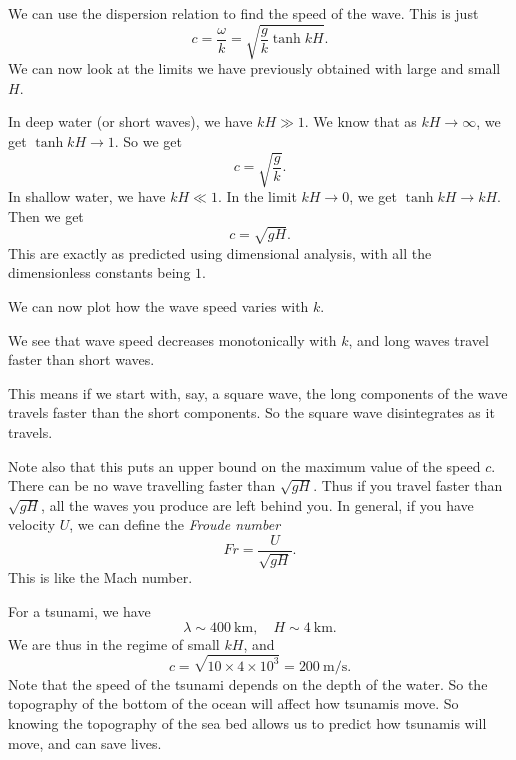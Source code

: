 \documentclass[a4paper]{article}
\begin{document}
We can use the dispersion relation to find the speed of the wave. This is just
\[
  c = \frac{\omega}{k} = \sqrt{\frac{g}{k}\tanh kH}.
\]
We can now look at the limits we have previously obtained with large and small $H$.

In deep water (or short waves), we have $kH \gg 1$. We know that as $kH \to \infty$, we get $\tanh kH \to 1$. So we get
\[
  c = \sqrt{\frac{g}{k}}.
\]
In shallow water, we have $kH \ll 1$. In the limit $kH \to 0$, we get $\tanh kH \to kH$. Then we get
\[
  c = \sqrt{gH}.
\]
This are exactly as predicted using dimensional analysis, with all the dimensionless constants being $1$.

We can now plot how the wave speed varies with $k$.
\begin{center}
\end{center}
We see that wave speed decreases monotonically with $k$, and long waves travel faster than short waves.

This means if we start with, say, a square wave, the long components of the wave travels faster than the short components. So the square wave disintegrates as it travels.

Note also that this puts an upper bound on the maximum value of the speed $c$. There can be no wave travelling faster than $\sqrt{gH}$. Thus if you travel faster than $\sqrt{gH}$, all the waves you produce are left behind you. In general, if you have velocity $U$, we can define the \emph{Froude number}
\[
  Fr = \frac{U}{\sqrt{gH}}.
\]
This is like the Mach number.

For a tsunami, we have
\[
  \lambda \sim \SI{400}{\kilo\meter},\quad H \sim \SI{4}{\kilo\meter}.
\]
We are thus in the regime of small $kH$, and
\[
  c = \sqrt{10 \times 4\times 10^3} = \SI{200}{\meter\per\second}.
\]
Note that the speed of the tsunami depends on the depth of the water. So the topography of the bottom of the ocean will affect how tsunamis move. So knowing the topography of the sea bed allows us to predict how tsunamis will move, and can save lives.
\end{document}
